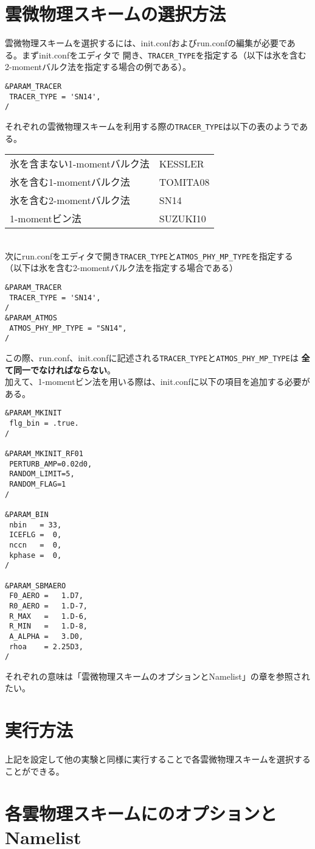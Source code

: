 \section{雲微物理スキームの選択方法}
雲微物理スキームを選択するには、init.confおよびrun.confの編集が必要である。まずinit.confをエディタで
開き、\verb|TRACER_TYPE|を指定する（以下は氷を含む2-momentバルク法を指定する場合の例である）。

\begin{verbatim}
&PARAM_TRACER
 TRACER_TYPE = 'SN14',
/
\end{verbatim}

それぞれの雲微物理スキームを利用する際の\verb|TRACER_TYPE|は以下の表のようである。\\


\begin{tabular}{ll}
\hline
氷を含まない1-momentバルク法\cite{kessler_1996}    & KESSLER\\             
氷を含む1-momentバルク法\cite{tomita_2008}         & TOMITA08\\
氷を含む2-momentバルク法\cite{sn_2041}             & SN14\\
1-momentビン法\cite{suzuki_etal_2010}              & SUZUKI10\\
\hline
\end{tabular}
\\
次にrun.confをエディタで開き\verb|TRACER_TYPE|と\verb|ATMOS_PHY_MP_TYPE|を指定する
（以下は氷を含む2-momentバルク法を指定する場合である）\\

\begin{verbatim}
&PARAM_TRACER
 TRACER_TYPE = 'SN14',
/
&PARAM_ATMOS
 ATMOS_PHY_MP_TYPE = "SN14",
/
\end{verbatim}

この際、run.conf、init.confに記述される\verb|TRACER_TYPE|と\verb|ATMOS_PHY_MP_TYPE|は
{\bf 全て同一でなければならない}。\\
加えて、1-momentビン法を用いる際は、init.confに以下の項目を追加する必要がある。\\

\begin{verbatim}
&PARAM_MKINIT
 flg_bin = .true.
/

&PARAM_MKINIT_RF01
 PERTURB_AMP=0.02d0,
 RANDOM_LIMIT=5,
 RANDOM_FLAG=1
/

&PARAM_BIN
 nbin   = 33,
 ICEFLG =  0,
 nccn   =  0,
 kphase =  0,
/

&PARAM_SBMAERO
 F0_AERO =   1.D7,
 R0_AERO =   1.D-7,
 R_MAX   =   1.D-6,
 R_MIN   =   1.D-8,
 A_ALPHA =   3.D0,
 rhoa    = 2.25D3,
/
\end{verbatim}

それぞれの意味は「雲微物理スキームのオプションとNamelist」の章を参照されたい。

\section{実行方法}
上記を設定して他の実験と同様に実行することで各雲微物理スキームを選択することができる。

\section{各雲物理スキームにのオプションとNamelist}
